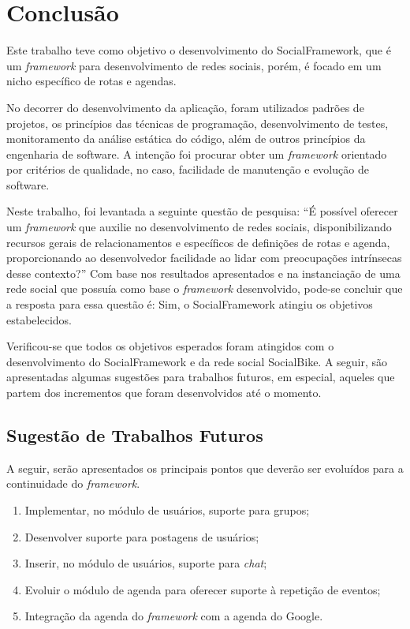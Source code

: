 \chapter{Conclusão}
\label{chapter:Conclusao}
Este trabalho teve como objetivo o desenvolvimento do SocialFramework, que é um \textit{framework} para desenvolvimento de redes sociais, porém, é focado em um nicho específico de rotas e agendas.

No decorrer do desenvolvimento da aplicação, foram utilizados padrões de projetos, os princípios das técnicas de programação, desenvolvimento de testes, monitoramento da análise estática do código, além de outros princípios da engenharia de software. A intenção foi procurar obter um \textit{framework} orientado por critérios de qualidade, no caso, facilidade de manutenção e evolução de software.

Neste trabalho, foi levantada a seguinte questão de pesquisa: ``É possível oferecer um \textit{framework} que auxilie no desenvolvimento de redes sociais, disponibilizando recursos gerais de relacionamentos e específicos de definições de rotas e agenda, proporcionando ao desenvolvedor facilidade ao lidar com preocupações intrínsecas desse contexto?'' Com base nos resultados apresentados e na instanciação de uma rede social que possuía como base o \textit{framework} desenvolvido, pode-se concluir que a resposta para essa questão é: Sim, o SocialFramework atingiu os objetivos estabelecidos.

Verificou-se que todos os objetivos esperados foram atingidos com o desenvolvimento do SocialFramework e da rede social SocialBike. A seguir, são apresentadas algumas sugestões para trabalhos futuros, em especial, aqueles que partem dos incrementos que foram desenvolvidos até o momento.

\section{Sugestão de Trabalhos Futuros}

A seguir, serão apresentados os principais pontos que deverão ser evoluídos para a continuidade do \textit{framework}.

\begin{enumerate}
	\item Implementar, no módulo de usuários, suporte para grupos;
	\item Desenvolver suporte para postagens de usuários;
	\item Inserir, no módulo de usuários, suporte para \textit{chat};
	\item Evoluir o módulo de agenda para oferecer suporte à repetição de eventos;
	\item Integração da agenda do \textit{framework} com a agenda do Google.
\end{enumerate}
